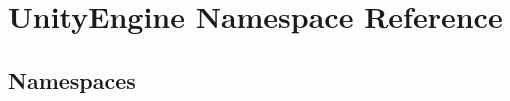 \hypertarget{namespace_unity_engine}{}\section{Unity\+Engine Namespace Reference}
\label{namespace_unity_engine}
\subsection*{Namespaces}
\begin{DoxyCompactItemize}
\end{DoxyCompactItemize}
